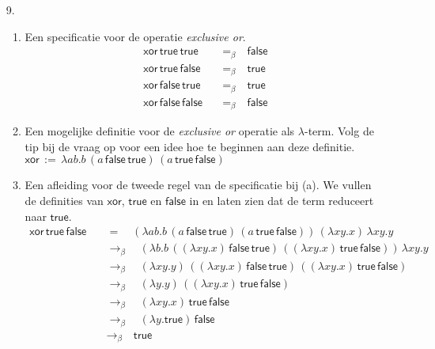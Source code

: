 \documentclass[a4paper,11pt]{article}
\begin{document}
\begin{enumerate}


\item[9.]

\begin{enumerate}

\item
Een specificatie voor de operatie \emph{exclusive or}.
\begin{align*}
  \textsf{xor} \, \textsf{true} \, \textsf{true} \quad & =_{\beta} \quad \textsf{false}\\
  \textsf{xor} \, \textsf{true} \, \textsf{false} \quad & =_{\beta} \quad \textsf{true}\\
  \textsf{xor} \, \textsf{false} \, \textsf{true} \quad & =_{\beta} \quad \textsf{true}\\
  \textsf{xor} \, \textsf{false} \, \textsf{false} \quad & =_{\beta} \quad \textsf{false}
\end{align*}

\item
Een mogelijke definitie voor de \emph{exclusive or} operatie als $\lambda$-term.
Volg de tip bij de vraag op voor een idee hoe te beginnen aan deze definitie.\\
$\textsf{xor} \, := \, \lambda a b. b \, (a \, \textsf{false} \, \textsf{true}) \, (a \, \textsf{true} \, \textsf{false})$

\item
Een afleiding voor de tweede regel van de specificatie bij (a). We vullen de definities
van $\textsf{xor}$, $\textsf{true}$ en $\textsf{false}$ in en laten zien dat de term
reduceert naar $\textsf{true}$.
\begin{align*}
  \textsf{xor} \, \textsf{true} \, \textsf{false}
  & \quad = \quad
  (\lambda a b. b \, (a \, \textsf{false} \, \textsf{true}) \, (a \, \textsf{true} \, \textsf{false})) \, (\lambda x y. x) \, \lambda x y. y\\
  & \quad \rightarrow_{\beta} \quad
  (\lambda b. b \, ((\lambda x y. x) \, \textsf{false} \, \textsf{true}) \, ((\lambda x y. x) \, \textsf{true} \, \textsf{false})) \, \lambda x y. y\\
  & \quad \rightarrow_{\beta} \quad
  (\lambda x y. y) \, ((\lambda x y. x) \, \textsf{false} \, \textsf{true}) \, ((\lambda x y. x) \, \textsf{true} \, \textsf{false})\\
  & \quad \rightarrow_{\beta} \quad
  (\lambda y. y) \, ((\lambda x y. x) \, \textsf{true} \, \textsf{false})\\
  & \quad \rightarrow_{\beta} \quad
  (\lambda x y. x) \, \textsf{true} \, \textsf{false}\\
  & \quad \rightarrow_{\beta} \quad
  (\lambda y. \textsf{true}) \, \textsf{false}\\
  & \quad \rightarrow_{\beta} \quad
  \textsf{true}
\end{align*}

\end{enumerate}


\end{enumerate}
\end{document}
